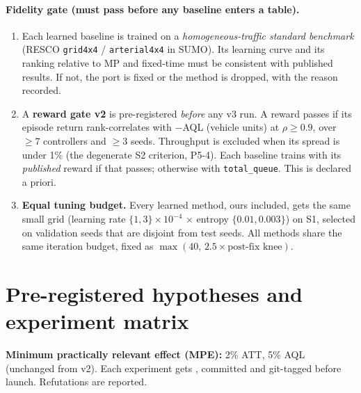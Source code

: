 \documentclass[11pt,a4paper]{article}
\newcommand{\file}[1]{\texttt{\detokenize{#1}}}
\begin{document}
\paragraph{Fidelity gate (must pass before any baseline enters a table).}
\begin{enumerate}
\item Each learned baseline is trained on a \emph{homogeneous-traffic standard benchmark}
      (RESCO \texttt{grid4x4} / \texttt{arterial4x4} in SUMO). Its learning curve and its
      ranking relative to MP and fixed-time must be consistent with published results.
      If not, the port is fixed or the method is dropped, with the reason recorded.
\item A \textbf{reward gate v2} is pre-registered \emph{before} any v3 run. A reward passes
      if its episode return rank-correlates with $-$AQL (vehicle units) at
      $\rho\ge0.9$, over $\ge7$ controllers and $\ge3$ seeds. Throughput is excluded when its
      spread is under 1\% (the degenerate S2 criterion, P5-4). Each baseline trains with its
      \emph{published} reward if that passes; otherwise with \texttt{total\_queue}. This is
      declared a priori.
\item \textbf{Equal tuning budget.} Every learned method, ours included, gets the same small
      grid (learning rate $\{1,3\}\times10^{-4}$ $\times$ entropy $\{0.01,0.003\}$) on S1,
      selected on validation seeds that are disjoint from test seeds. All methods share the
      same iteration budget, fixed as $\max(40,\,2.5\times\text{post-fix knee})$.
\end{enumerate}

\section{Pre-registered hypotheses and experiment matrix}
\label{sec:stats}
\textbf{Minimum practically relevant effect (MPE):} 2\% ATT, 5\% AQL (unchanged from v2).
Each experiment gets \file{experiments/EXX/prereg.md}, committed and git-tagged before
launch. Refutations are reported.
\end{document}
